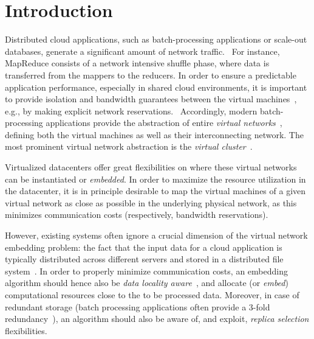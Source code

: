 \documentclass[9pt]{sigcomm-alternate}
\begin{document}
\section{Introduction}


Distributed cloud applications, such as batch-processing applications or scale-out databases, generate a significant amount of network traffic.~\cite{talk-about}
For instance, MapReduce consists of a network intensive shuffle phase,
where data is transferred from the mappers to the reducers.
In order to ensure a predictable application performance, especially in shared cloud environments,
it is important to provide isolation and bandwidth guarantees between the virtual machines~\cite{amazonbw},
e.g., by making explicit network reservations.~\cite{oktopus}
Accordingly, modern batch-processing applications provide the abstraction of entire \emph{virtual networks}~\cite{talk-about},
defining both the virtual machines
as well as their interconnecting network. The most prominent virtual network abstraction is the \emph{virtual cluster}~\cite{oktopus,proteus}.

Virtualized datacenters
offer great flexibilities on where these virtual networks
can be instantiated or \emph{embedded}.
In order to maximize the resource utilization in the datacenter, it is in principle desirable to
map the virtual machines of a given virtual network as close as possible
in the underlying physical network, as this minimizes communication costs (respectively, bandwidth reservations).~\cite{oktopus,proteus}

However, existing systems often ignore a crucial dimension of the virtual network embedding problem:
the fact that the input data for a cloud application is typically distributed across different servers and stored in a distributed file system~\cite{scope,google-fs,hdfs}.
In order to properly minimize
communication costs, an embedding algorithm should hence also be \emph{data locality aware}~\cite{local-schedule-1,local-schedule-2,local-schedule-3},
and allocate (or \emph{embed}) computational resources close to the to be processed data.
Moreover, in case of redundant storage (batch processing
applications often provide a 3-fold redundancy~\cite{hdfs}), an algorithm should also be aware of, and exploit, \emph{replica selection}
flexibilities.
\end{document}
